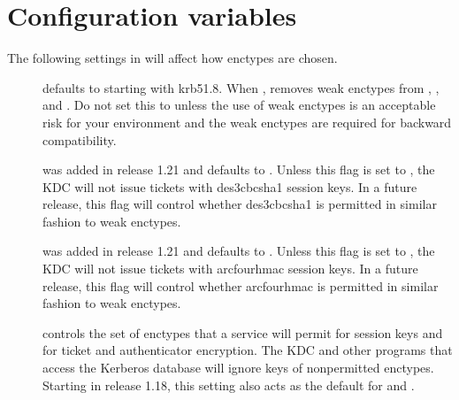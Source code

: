 \documentclass[letterpaper,10pt,english]{sphinxmanual}
\begin{document}
\section{Configuration variables}
\label{\detokenize{admin/enctypes:configuration-variables}}
\sphinxAtStartPar
The following \sphinxcode{\sphinxupquote{{[}libdefaults{]}}} settings in {\hyperref[\detokenize{admin/conf_files/krb5_conf:krb5-conf-5}]{}} will
affect how enctypes are chosen.
\begin{description}
\item[{}] \leavevmode
\sphinxAtStartPar
defaults to  starting with krb5\sphinxhyphen{}1.8.  When , removes
weak enctypes from ,
, and .  Do not
set this to  unless the use of weak enctypes is an
acceptable risk for your environment and the weak enctypes are
required for backward compatibility.

\item[{}] \leavevmode
\sphinxAtStartPar
was added in release 1.21 and defaults to .  Unless this
flag is set to , the KDC will not issue tickets with
des3\sphinxhyphen{}cbc\sphinxhyphen{}sha1 session keys.  In a future release, this flag will
control whether des3\sphinxhyphen{}cbc\sphinxhyphen{}sha1 is permitted in similar fashion to
weak enctypes.

\item[{}] \leavevmode
\sphinxAtStartPar
was added in release 1.21 and defaults to .  Unless this
flag is set to , the KDC will not issue tickets with
arcfour\sphinxhyphen{}hmac session keys.  In a future release, this flag will
control whether arcfour\sphinxhyphen{}hmac is permitted in similar fashion to
weak enctypes.

\item[{}] \leavevmode
\sphinxAtStartPar
controls the set of enctypes that a service will permit for
session keys and for ticket and authenticator encryption.  The KDC
and other programs that access the Kerberos database will ignore
keys of non\sphinxhyphen{}permitted enctypes.  Starting in release 1.18, this
setting also acts as the default for  and
.


\end{description}
\end{document}
